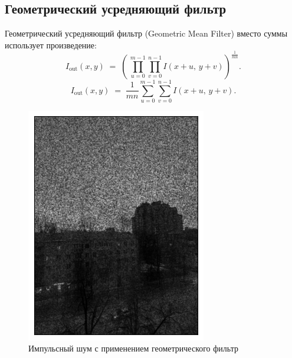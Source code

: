 \documentclass[a4paper,12pt]{article}
\begin{document}
\subsection{Геометрический усредняющий фильтр}
Геометрический усредняющий фильтр (Geometric Mean Filter) вместо суммы использует произведение:
\begin{equation}
I_{\text{out}}(x,y) \;=\;
\left(\,
\prod_{u=0}^{m-1} \prod_{v=0}^{n-1} I(x+u,\,y+v)
\right)^{\tfrac{1}{mn}}.
\end{equation}
\begin{equation}
I_{\text{out}}(x,y) \;=\; \frac{1}{mn} \sum_{u=0}^{m-1} \sum_{v=0}^{n-1} I(x+u,\,y+v).
\end{equation}
\begin{figure}[H]
    \begin{minipage}{0.49\textwidth}
        \centering \includegraphics[width=\textwidth]{results/lpf_sap_2.png}
        \caption{Импульсный шум с применением геометрического фильтр}
    \end{minipage}\hfill

\end{figure}
\end{document}
